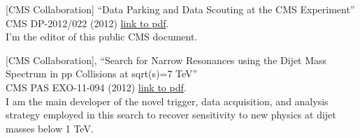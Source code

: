 \documentclass[10pt, a4paper]{article}
\begin{document}
\begin{thebibliography}{599}

 

[CMS Collaboration]
``Data Parking and Data Scouting at the CMS Experiment''
  CMS DP-2012/022 (2012)
  \href{http://cds.cern.ch/record/1480607/files/DP2012\_022.pdf}{link
    to pdf}.
  \\I'm the editor of this public CMS document.

[CMS Collaboration],
``Search for Narrow Resonances using the Dijet Mass Spectrum in pp Collisions at sqrt(s)=7 TeV''\\
  CMS PAS EXO-11-094 (2012)
  \href{http://cds.cern.ch/record/1461223/files/EXO-11-094-pas.pdf}{link
  to pdf}.
  \\ I am the main developer of the novel trigger, data acquisition, and analysis strategy employed in this search to recover sensitivity to new physics at dijet masses below 1 TeV.


\end{thebibliography}
\end{document}
